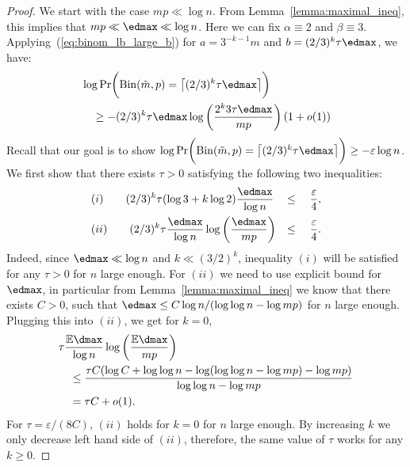 \begin{proof}
    \noindent
    We start with the case \(mp \ll \log n\). From Lemma~\ref{lemma:maximal_ineq}, this implies that \(mp \ll \edmax \ll \log n\). Here we can fix \(\alpha \equiv 2\) and \(\beta \equiv 3\). Applying~(\ref{eq:binom_lb_large_b}) for \(a = 3^{-k-1}m\) and \(b = (2/3)^k \tau \edmax\), we have:
    \begin{equation}
        \begin{aligned}
        &\log \Pr\biggl(\mathrm{Bin}(\tilde m, p) = \bigl\lceil (2/3)^k \tau \edmax\bigr\rceil \biggr) \\
        &\quad \geq - (2/3)^k \tau \edmax \log \left(\frac{2^k 3 \tau \edmax}{ mp}\right) (1 + o(1))
        \end{aligned}
    \end{equation}
    Recall that our goal is to show \(\log \Pr\biggl(\mathrm{Bin}(\tilde m, p) = \bigl\lceil (2/3)^k \tau \edmax\bigr\rceil \biggr) \geq -\varepsilon \log n\). We first show that there exists \(\tau > 0\) satisfying the following two inequalities:
    \begin{equation}
    \begin{aligned}
        &(i) \qquad (2/3)^k \tau (\log 3 + k \log 2 ) \frac{\edmax}{\log n} &\leq \quad \frac{\varepsilon}{4}, \\
        &(ii) \qquad (2/3)^k \tau \frac{\edmax}{\log n} \log \left(\frac{\edmax}{mp}\right) &\leq \quad \frac{\varepsilon}{4}.
    \end{aligned}
    \end{equation}
    Indeed, since \(\edmax \ll \log n\) and \(k \ll (3/2)^k\), inequality \((i)\) will be satisfied for any \(\tau > 0\) for \(n\) large enough. For \((ii)\) we need to use explicit bound for \(\edmax\), in particular from Lemma~\ref{lemma:maximal_ineq} we know that there exists \(C > 0\), such that \(\edmax \leq C \log n / (\log \log n - \log mp)\) for \(n\) large enough. Plugging this into \((ii)\), we get for \(k = 0\),
    \begin{equation}
        \begin{aligned}
        &\tau \frac{\mathbb{E}\dmax}{\log n}\log\left(\frac{\mathbb{E}\dmax}{mp}\right) \\
        &\quad \leq \frac{\tau C (\log C + \log \log n - \log (\log \log n - \log mp) - \log mp)}{\log \log n - \log mp} \\
        &\quad = \tau C + o(1).
        \end{aligned}
    \end{equation}
    For \(\tau = \varepsilon / (8C)\), \((ii)\) holds for \(k = 0\) for \(n\) large enough. By increasing \(k\) we only decrease left hand side of \((ii)\), therefore, the same value of \(\tau\) works for any \(k \geq 0\). 


\end{proof}
